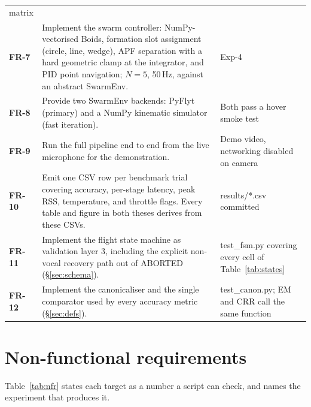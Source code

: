 \documentclass[11pt,a4paper]{article}
\newcommand{\code}[1]{{\ttfamily\small #1}}
\newcommand{\munit}[1]{\,#1}
\begin{document}
\begin{longtable}{@{}P{0.07}P{0.62}P{0.24}@{}}
                 matrix \\
\textbf{FR-7}  & Implement the swarm controller: NumPy-vectorised Boids, formation slot assignment
                 (circle, line, wedge), APF separation with a hard geometric clamp at the integrator, and
                 PID point navigation; $N=5$, 50\munit{Hz}, against an abstract \code{SwarmEnv}. & Exp-4 \\
\textbf{FR-8}  & Provide two \code{SwarmEnv} backends: PyFlyt (primary) and a NumPy kinematic simulator
                 (fast iteration). & Both pass a hover smoke test \\
\textbf{FR-9}  & Run the full pipeline end to end from the live microphone for the demonstration. &
                 Demo video, networking disabled on camera \\
\textbf{FR-10} & Emit one CSV row per benchmark trial covering accuracy, per-stage latency, peak RSS,
                 temperature, and throttle flags. Every table and figure in both theses derives from these
                 CSVs. & \code{results/*.csv} committed \\
\textbf{FR-11} & Implement the flight state machine as validation layer 3, including the explicit
                 non-vocal recovery path out of \code{ABORTED} (\S\ref{sec:schema}). &
                 \code{test\_fsm.py} covering every cell of Table~\ref{tab:states} \\
\textbf{FR-12} & Implement the canonicaliser and the single comparator used by every accuracy metric
                 (\S\ref{sec:defs}). & \code{test\_canon.py}; EM and CRR call the same function \\
\end{longtable}

\section{Non-functional requirements}

Table~\ref{tab:nfr} states each target as a number a script can check, and names the experiment that
produces it.
\end{document}

